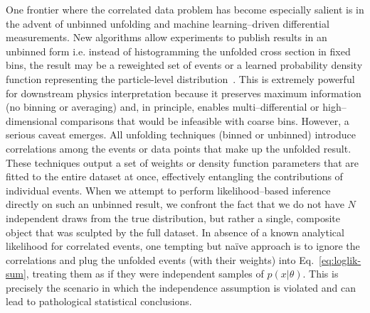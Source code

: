     One frontier where the correlated data problem has become especially salient is in the advent of unbinned unfolding and machine learning--driven differential measurements.
    New algorithms allow experiments to publish results in an unbinned form i.e. instead of histogramming the unfolded cross section in fixed bins, the result may be a reweighted set of events or a learned probability density function representing the particle-level distribution~.
    This is extremely powerful for downstream physics interpretation because it preserves maximum information (no binning or averaging) and, in principle, enables multi--differential or high--dimensional comparisons that would be infeasible with coarse bins.
    However, a serious caveat emerges.
    All unfolding techniques (binned or unbinned) introduce correlations among the events or data points that make up the unfolded result.
    These techniques output a set of weights or density function parameters that are fitted to the entire dataset at once, effectively entangling the contributions of individual events.
    When we attempt to perform likelihood--based inference directly on such an unbinned result, we confront the fact that we do not have $N$ independent draws from the true distribution, but rather a single, composite object that was sculpted by the full dataset.
    In absence of a known analytical likelihood for correlated events, one tempting but na\"ive approach is to ignore the correlations and plug the unfolded events (with their weights) into Eq.~\ref{eq:loglik-sum}, treating them as if they were independent samples of $p(x|\theta)$.
    This is precisely the scenario in which the independence assumption is violated and can lead to pathological statistical conclusions.

